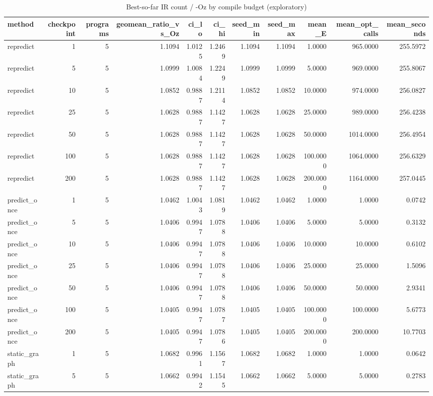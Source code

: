 \begin{table}[t]
\centering
\caption{Best-so-far IR count / -Oz by compile budget (exploratory)}
\label{tab:v3-1-budget-curves}
\begin{tabular}{lrrrrrrrrrr}
\toprule
method & checkpoint & programs & geomean\_ratio\_vs\_Oz & ci\_lo & ci\_hi & seed\_min & seed\_max & mean\_E & mean\_opt\_calls & mean\_seconds \\
\midrule
repredict & 1 & 5 & 1.1094 & 1.0125 & 1.2469 & 1.1094 & 1.1094 & 1.0000 & 965.0000 & 255.5972 \\
repredict & 5 & 5 & 1.0999 & 1.0084 & 1.2249 & 1.0999 & 1.0999 & 5.0000 & 969.0000 & 255.8067 \\
repredict & 10 & 5 & 1.0852 & 0.9887 & 1.2114 & 1.0852 & 1.0852 & 10.0000 & 974.0000 & 256.0827 \\
repredict & 25 & 5 & 1.0628 & 0.9887 & 1.1427 & 1.0628 & 1.0628 & 25.0000 & 989.0000 & 256.4238 \\
repredict & 50 & 5 & 1.0628 & 0.9887 & 1.1427 & 1.0628 & 1.0628 & 50.0000 & 1014.0000 & 256.4954 \\
repredict & 100 & 5 & 1.0628 & 0.9887 & 1.1427 & 1.0628 & 1.0628 & 100.0000 & 1064.0000 & 256.6329 \\
repredict & 200 & 5 & 1.0628 & 0.9887 & 1.1427 & 1.0628 & 1.0628 & 200.0000 & 1164.0000 & 257.0445 \\
predict\_once & 1 & 5 & 1.0462 & 1.0043 & 1.0819 & 1.0462 & 1.0462 & 1.0000 & 1.0000 & 0.0742 \\
predict\_once & 5 & 5 & 1.0406 & 0.9947 & 1.0788 & 1.0406 & 1.0406 & 5.0000 & 5.0000 & 0.3132 \\
predict\_once & 10 & 5 & 1.0406 & 0.9947 & 1.0788 & 1.0406 & 1.0406 & 10.0000 & 10.0000 & 0.6102 \\
predict\_once & 25 & 5 & 1.0406 & 0.9947 & 1.0788 & 1.0406 & 1.0406 & 25.0000 & 25.0000 & 1.5096 \\
predict\_once & 50 & 5 & 1.0406 & 0.9947 & 1.0788 & 1.0406 & 1.0406 & 50.0000 & 50.0000 & 2.9341 \\
predict\_once & 100 & 5 & 1.0405 & 0.9947 & 1.0787 & 1.0405 & 1.0405 & 100.0000 & 100.0000 & 5.6773 \\
predict\_once & 200 & 5 & 1.0405 & 0.9947 & 1.0786 & 1.0405 & 1.0405 & 200.0000 & 200.0000 & 10.7703 \\
static\_graph & 1 & 5 & 1.0682 & 0.9961 & 1.1567 & 1.0682 & 1.0682 & 1.0000 & 1.0000 & 0.0642 \\
static\_graph & 5 & 5 & 1.0662 & 0.9942 & 1.1545 & 1.0662 & 1.0662 & 5.0000 & 5.0000 & 0.2783 \\

\end{tabular}
\end{table}

